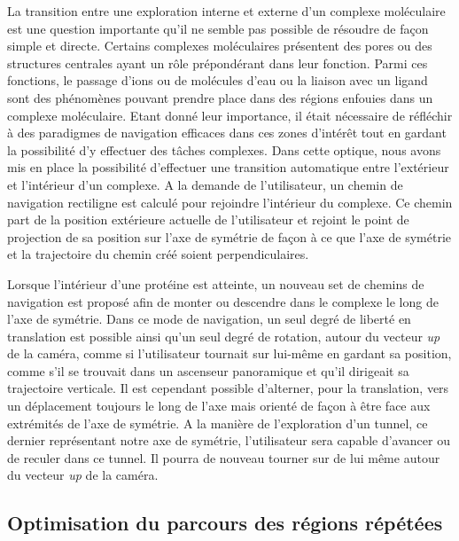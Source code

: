La transition entre une exploration interne et externe d'un complexe moléculaire est une question importante qu'il ne semble pas possible de résoudre de façon simple et directe. Certains complexes moléculaires présentent des pores ou des structures centrales ayant un rôle prépondérant dans leur fonction. Parmi ces fonctions, le passage d'ions ou de molécules d'eau ou la liaison avec un ligand sont des phénomènes pouvant prendre place dans des régions enfouies dans un complexe moléculaire. Etant donné leur importance, il était nécessaire de réfléchir à des paradigmes de navigation efficaces dans ces zones d'intérêt tout en gardant la possibilité d'y effectuer des tâches complexes. Dans cette optique, nous avons mis en place la possibilité d'effectuer une transition automatique entre l'extérieur et l'intérieur d'un complexe. A la demande de l'utilisateur, un chemin de navigation rectiligne est calculé pour rejoindre l'intérieur du complexe. Ce chemin part de la position extérieure actuelle de l'utilisateur et rejoint le point de projection de sa position sur l'axe de symétrie de façon à ce que l'axe de symétrie et la trajectoire du chemin créé soient perpendiculaires. 

Lorsque l'intérieur d'une protéine est atteinte, un nouveau set de chemins de navigation est proposé afin de monter ou descendre dans le complexe le long de l'axe de symétrie. Dans ce mode de navigation, un seul degré de liberté en translation est possible ainsi qu'un seul degré de rotation, autour du vecteur \textit{up} de la caméra, comme si l'utilisateur tournait sur lui-même en gardant sa position, comme s'il se trouvait dans un ascenseur panoramique et qu'il dirigeait sa trajectoire verticale. Il est cependant possible d'alterner, pour la translation, vers un déplacement toujours le long de l'axe mais orienté de façon à être face aux extrémités de l'axe de symétrie. A la manière de l'exploration d'un tunnel, ce dernier représentant notre axe de symétrie, l'utilisateur sera capable d'avancer ou de reculer dans ce tunnel. Il pourra de nouveau tourner sur de lui même autour du vecteur \textit{up} de la caméra.

\subsection{Optimisation du parcours des régions répétées}

